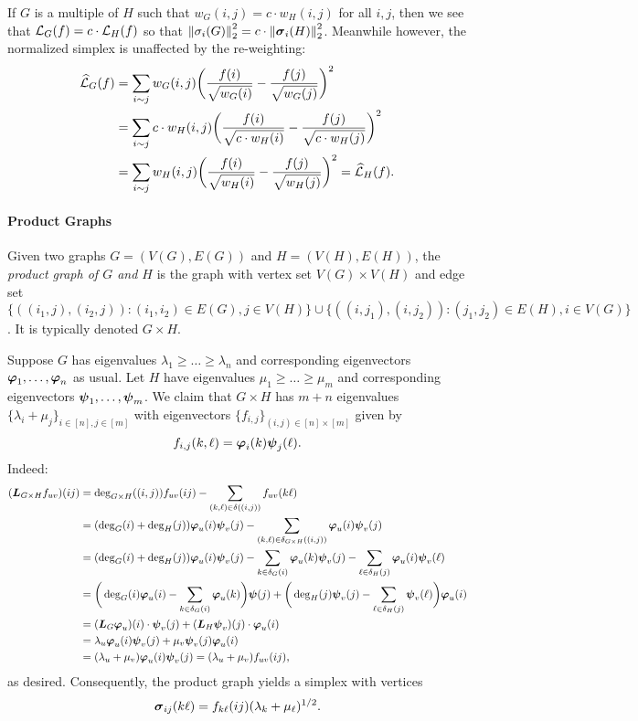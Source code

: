 If $G$ is a multiple of $H$ such that $w_G(i,j)=c\cdot w_H(i,j)$ for all $i,j$, then we see that $\mathcal{L}_G(f)=c\cdot \mathcal{L}_H(f)$ so that $\norm{\sigma_i(G)}_2^2 =c\cdot \norm{\vb*{\sigma}_i(H)}_2^2$. Meanwhile however, the normalized simplex is unaffected by the re-weighting: 
\begin{align*}\widehat{\mathcal{L}}_G(f)&=\sum_{i\sim j}w_G(i,j)\bigg(\frac{f(i)}{\sqrt{w_G(i)}}-\frac{f(j)}{\sqrt{w_G(j)}}\bigg)^2\\
&= \sum_{i\sim j}c\cdot w_H(i,j)\bigg(\frac{f(i)}{\sqrt{c\cdot w_H(i)}}-\frac{f(j)}{\sqrt{c\cdot w_H(j)}}\bigg)^2 \\
&= \sum_{i\sim j} w_H(i,j)\bigg(\frac{f(i)}{\sqrt{ w_H(i)}}-\frac{f(j)}{\sqrt{ w_H(j)}}\bigg)^2 = \widehat{\mathcal{L}}_H(f).
\end{align*}

\paragraph{Product Graphs}

\begin{definition}
	\label{def:product_graphs}
	Given two graphs $G=(V(G),E(G))$ and $H=(V(H), E(H))$, the \emph{product graph of $G$ and $H$} is the graph with vertex set $V(G)\times V(H)$ and edge set
	$\{((i_1,j),(i_2,j)):(i_1,i_2)\in E(G), j\in V(H)\}\cup\{((i,j_1),(i,j_2)):(j_1,j_2)\in E(H), i\in V(G)\}$. It is typically denoted $G\times H$. 
\end{definition} 

Suppose $G$ has eigenvalues $\lambda_1\geq \dots\geq \lambda_{n}$ and corresponding eigenvectors $\vb*{\varphi}_1,\dots,\vb*{\varphi}_{n}$ as usual. Let $H$ have eigenvalues $\mu_1\geq \dots\geq \mu_{m}$ and corresponding eigenvectors $\vb*{\psi}_1,\dots,\vb*{\psi}_{m}$. 
We claim that $G\times H$ has $m+n$ eigenvalues $\{\lambda_i+\mu_j\}_{i\in[n],j\in[m]}$ with eigenvectors $\{f_{i,j}\}_{(i,j)\in[n]\times[m]}$ given by 
\[f_{i,j}(k,\ell) = \vb*{\varphi}_i(k)\vb*{\psi}_j(\ell).\]
Indeed: 
\begin{align*}
(\vb*{L}_{G\times H} f_{uv})(ij) &= \deg_{G\times H}((i,j))f_{uv}(ij) - \sum_{(k,\ell)\in \delta((i,j))} f_{uv}(k\ell) \\
&= (\deg_G(i)+\deg_H(j))\vb*{\varphi}_u(i)\vb*{\psi}_v(j) - \sum_{(k,\ell)\in \delta_{G\times H}((i,j))} \vb*{\varphi}_u(i)\vb*{\psi}_v(j) \\
&= (\deg_G(i)+\deg_H(j))\vb*{\varphi}_u(i)\vb*{\psi}_v(j) - \sum_{k\in \delta_G(i)} \vb*{\varphi}_u(k)\vb*{\psi}_v(j) - \sum_{\ell\in \delta_H(j)} \vb*{\varphi}_u(i)\vb*{\psi}_v(\ell) \\
&=\bigg(\deg_G(i)\vb*{\varphi}_u(i) - \sum_{k\in\delta_G(i)}\vb*{\varphi}_u(k)\bigg)\vb*{\psi}(j) + \bigg(\deg_H(j)\vb*{\psi}_v(j)-\sum_{\ell\in\delta_H(j)}\vb*{\psi}_v(\ell)\bigg)\vb*{\varphi}_u(i) \\
&= (\vb*{L}_G \vb*{\varphi}_u)(i) \cdot \vb*{\psi}_v(j) + (\vb*{L}_H\vb*{\psi}_v)(j)\cdot \vb*{\varphi}_u(i) \\
&= \lambda_u\vb*{\varphi}_u(i) \vb*{\psi}_v(j) + \mu_v\vb*{\psi}_v(j)\vb*{\varphi}_u(i) \\
&= (\lambda_u+\mu_v)\vb*{\varphi}_u(i)\vb*{\psi}_v(j) = (\lambda_u+\mu_v)f_{uv}(ij),
\end{align*}
as desired. Consequently, the product graph yields a simplex with vertices 
\[\vb*{\sigma}_{ij}(k\ell)=f_{k\ell}(ij)(\lambda_k+\mu_\ell)^{1/2}.\]


